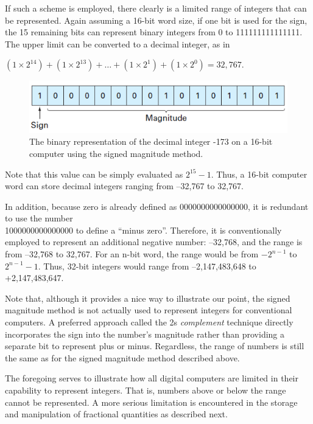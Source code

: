 \documentclass[../main.tex]{subfiles}
\begin{document}
If such a scheme is employed, there clearly is a limited range of integers that can be represented.
Again assuming a 16-bit word size, if one bit is used for the sign, the 15 remaining
bits can represent binary integers from 0 to 111111111111111. The upper limit can be converted
to a decimal integer, as in 

$(1 \times2^{14}) +(1 \times2^{13}) +\hdots +(1 \times2^{1}) +(1 \times2^{0}) = 32,767$.\\


\begin{figure}[h]
    \includegraphics{./images/fig_4_3}
    \caption{The binary representation of the decimal integer -173 on a 16-bit computer using the signed
    magnitude method.}
\end{figure}

\noindent
Note that this value can be simply evaluated as $2^{15}-1$. Thus, a 16-bit computer word can
store decimal integers ranging from --32,767 to 32,767.

In addition, because zero is already defined as 0000000000000000, it is redundant
to use the number \\1000000000000000 to define a ``minus zero''. Therefore, it is conventionally
employed to represent an additional negative number: --32,768, and the range is
from --32,768 to 32,767. For an n-bit word, the range would be from  $-2^{n-1}$ to $2^{n-1}-1$.
Thus, 32-bit integers would range from --2,147,483,648 to +2,147,483,647.

Note that, although it provides a nice way to illustrate our point, the signed magnitude
method is not actually used to represent integers for conventional computers. A preferred
approach called the 2s \emph{complement} technique directly incorporates the sign into the
number's magnitude rather than providing a separate bit to represent plus or minus.
Regardless, the range of numbers is still the same as for the signed magnitude method
described above.

The foregoing serves to illustrate how all digital computers are limited in their capability
to represent integers. That is, numbers above or below the range cannot be represented. A
more serious limitation is encountered in the storage and manipulation of fractional quantities
as described next.\\
\end{document}
